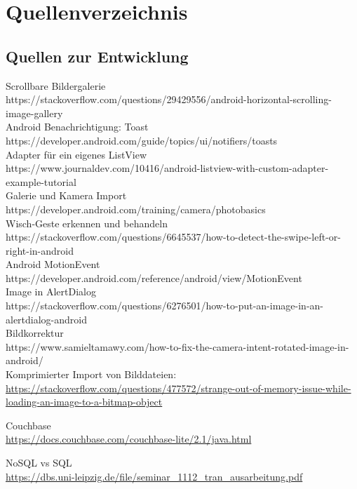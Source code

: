 \section{Quellenverzeichnis}


\subsection{Quellen zur Entwicklung}
Scrollbare Bildergalerie\\
https://stackoverflow.com/questions/29429556/android-horizontal-scrolling-image-gallery\\
Android Benachrichtigung: Toast\\
https://developer.android.com/guide/topics/ui/notifiers/toasts\\
Adapter für ein eigenes ListView\\
https://www.journaldev.com/10416/android-listview-with-custom-adapter-example-tutorial\\
Galerie und Kamera Import\\
https://developer.android.com/training/camera/photobasics\\
Wisch-Geste erkennen und behandeln\\
https://stackoverflow.com/questions/6645537/how-to-detect-the-swipe-left-or-right-in-android\\
Android MotionEvent\\
https://developer.android.com/reference/android/view/MotionEvent\\
Image in AlertDialog\\
https://stackoverflow.com/questions/6276501/how-to-put-an-image-in-an-alertdialog-android\\
Bildkorrektur\\
https://www.samieltamawy.com/how-to-fix-the-camera-intent-rotated-image-in-android/\\

Komprimierter Import von Bilddateien:\\
\url{https://stackoverflow.com/questions/477572/strange-out-of-memory-issue-while-loading-an-image-to-a-bitmap-object}

Couchbase\\
\url{https://docs.couchbase.com/couchbase-lite/2.1/java.html}

NoSQL vs SQL\\
\url{https://dbs.uni-leipzig.de/file/seminar_1112_tran_ausarbeitung.pdf}

